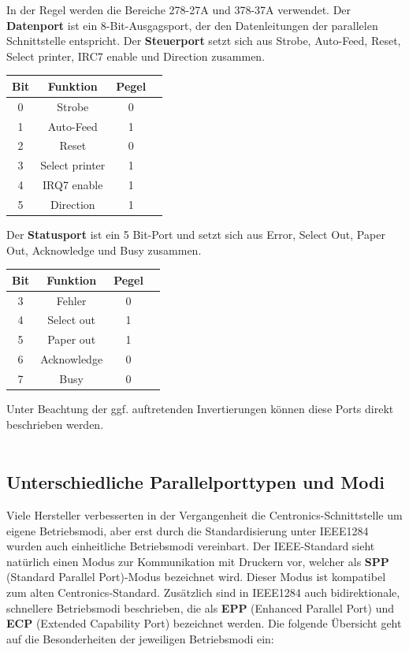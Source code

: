 \documentclass[a4paper,11pt]{article}
\begin{document}
In der Regel werden die Bereiche 278-27A und 378-37A verwendet. Der \textbf{Datenport} ist ein 8-Bit-Ausgagsport, der den Datenleitungen der parallelen Schnittstelle entspricht.  Der \textbf{Steuerport} setzt sich aus  Strobe, Auto-Feed, Reset, Select printer, IRC7 enable und Direction zusammen. 
\\
 \begin{tabular}{|c|c|c|c|}
  \hline
Bit	&	Funktion	&	Pegel  \\ \hline
0	&	Strobe		&	0 \\ \hline
1	&	Auto-Feed	&	1\\ \hline
2	&	Reset		&	0\\ \hline
3	&	Select printer	&	1\\ \hline
4	&	IRQ7 enable	&	1\\ \hline
5	&	Direction	&	1\\ \hline
 \end{tabular} 

Der \textbf{Statusport} ist ein 5 Bit-Port und setzt sich aus Error, Select Out, Paper Out, Acknowledge und Busy zusammen. 


 \begin{tabular}{|c|c|c|c|}
  \hline
Bit	&	Funktion	&	Pegel\\ \hline
3	&	Fehler		&	0 	\\ \hline
4	&	Select out	&	1 \\ \hline
5	&	Paper out	&	1 \\ \hline
6	&	Acknowledge	&	0 \\ \hline
7	&	Busy		&	0 \\ \hline
 \end{tabular} 

Unter Beachtung der ggf. auftretenden Invertierungen können diese Ports direkt beschrieben werden.\\\\

\subsection{Unterschiedliche Parallelporttypen und Modi}

Viele Hersteller verbesserten in der Vergangenheit die Centronics-Schnittstelle um eigene Betriebsmodi, aber erst durch die Standardisierung unter IEEE1284 wurden auch einheitliche Betriebsmodi vereinbart. Der IEEE-Standard sieht natürlich einen Modus zur Kommunikation mit Druckern vor, welcher als \textbf{SPP} (Standard Parallel Port)-Modus bezeichnet wird. Dieser Modus ist kompatibel zum alten Centronics-Standard. Zusätzlich sind in IEEE1284 auch bidirektionale, schnellere Betriebsmodi beschrieben, die als \textbf{EPP} (Enhanced Parallel Port) und \textbf{ECP} (Extended Capability Port) bezeichnet werden. Die folgende Übersicht geht auf die Besonderheiten der jeweiligen Betriebsmodi ein: \\\\
\end{document}
